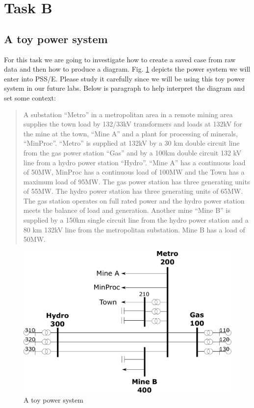 \documentclass[paper=a4, fontsize=11pt]{article}
\begin{document}
\newpage
\section{Task B}

\subsection{A toy power system}
For this task we are going to investigate how to create a saved case from raw data and then how to produce a diagram. Fig. \ref{fig:7} depicts the power system we will enter into PSS/E. Please study it carefully since we will be using this toy power system in our future labs. Below is paragraph to help interpret the diagram and set some context:

\begin{quote}
A substation ``Metro'' in a metropolitan area in a remote mining area supplies the town load by 132/33kV transformers and loads at 132kV for the mine at the town, ``Mine A'' and a plant for processing of minerals, ``MinProc''. ``Metro'' is supplied at 132kV by a 30 km double circuit line from the gas power station ``Gas'' and by a 100km double circuit 132 kV line from a hydro power station ``Hydro''. ``Mine A'' has a continuous load of 50MW, MinProc has a continuous load of 100MW and the Town has a maximum load of 95MW. The gas power station has three generating units of 55MW. The hydro power station has three generating units of 65MW. The gas station operates on full rated power and the hydro power station meets the balance of load and generation. Another mine ``Mine B'' is supplied by a 150km single circuit line from the hydro power station and a 80 km 132kV line from the metropolitan substation. Mine B has a load of 50MW.
\end{quote}

\bigbreak

\begin{figure}[h]
\centering
\includegraphics[width=0.8\linewidth]{fig7_taskb.pdf}
\caption{A toy power system}
\label{fig:7}
\end{figure}
\end{document}
